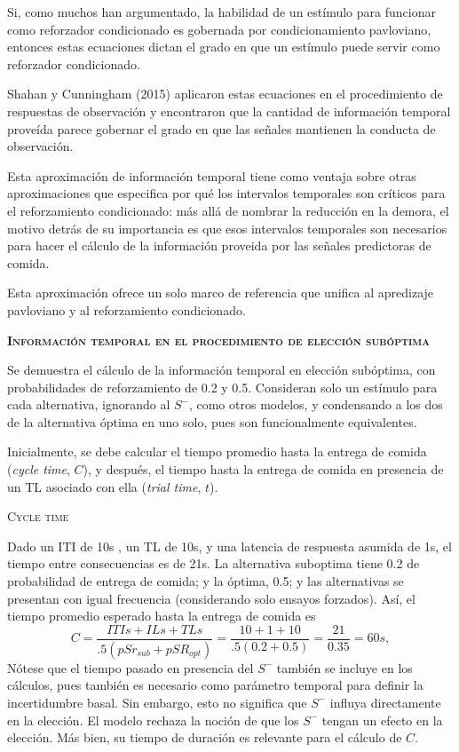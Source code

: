 \documentclass[a4paper,12pt]{article}
\begin{document}
Si, como muchos han argumentado, la habilidad de un estímulo para funcionar como reforzador condicionado es gobernada por condicionamiento pavloviano, entonces estas ecuaciones dictan el grado en que un estímulo puede servir como reforzador condicionado.

Shahan y Cunningham (2015) aplicaron estas ecuaciones en el procedimiento de respuestas de observación y encontraron que la cantidad de información temporal proveída parece gobernar el grado en que las señales mantienen la conducta de observación.

Esta aproximación de información temporal tiene como ventaja sobre otras aproximaciones que especifica por qué los intervalos temporales son críticos para el reforzamiento condicionado: más allá de nombrar la reducción en la demora, el motivo detrás de su importancia es que esos intervalos temporales son necesarios para hacer el cálculo de la información proveida por las señales predictoras de comida.

Esta aproximación ofrece un solo marco de referencia que unifica al apredizaje pavloviano y al reforzamiento condicionado. 

{\scshape\bfseries Información temporal en el procedimiento de elección subóptima}

Se demuestra el cálculo de la información temporal en elección subóptima, con probabilidades de reforzamiento de 0.2 y 0.5. Consideran solo un estímulo para cada alternativa, ignorando al $S^-$, como otros modelos, y condensando a los dos de la alternativa óptima en uno solo, pues son funcionalmente equivalentes.

Inicialmente, se debe calcular el tiempo promedio hasta la entrega de comida ({\itshape cycle time}, $C$), y después, el tiempo hasta la entrega de comida en presencia de un TL asociado con ella ({\itshape trial time}, $t$).

{\scshape Cycle time}

Dado un ITI de 10s , un TL de 10s, y una latencia de respuesta asumida de 1s, el tiempo entre consecuencias es de 21s. La alternativa suboptima tiene 0.2 de probabilidad de entrega de comida; y la óptima, 0.5; y las alternativas se presentan con igual frecuencia (considerando solo ensayos forzados). Así, el tiempo promedio esperado hasta la entrega de comida es
$$C=\frac{ITIs+ILs+TLs}{{.}5(pSr_{sub}+pSR_{opt})}=\frac{10+1+10}{{.}5(0{.}2+0{.}5)}=\frac{21}{0{.}35}=60s,
$$
Nótese que el tiempo pasado en presencia del $S^-$ también se incluye en los cálculos, pues también es necesario como parámetro temporal para definir la incertidumbre basal. Sin embargo, esto no significa que $S^-$ influya directamente en la elección. El modelo rechaza la noción de que los $S^-$ tengan un efecto en la elección. Más bien, su tiempo de duración es relevante para el cálculo de $C$.
\end{document}
